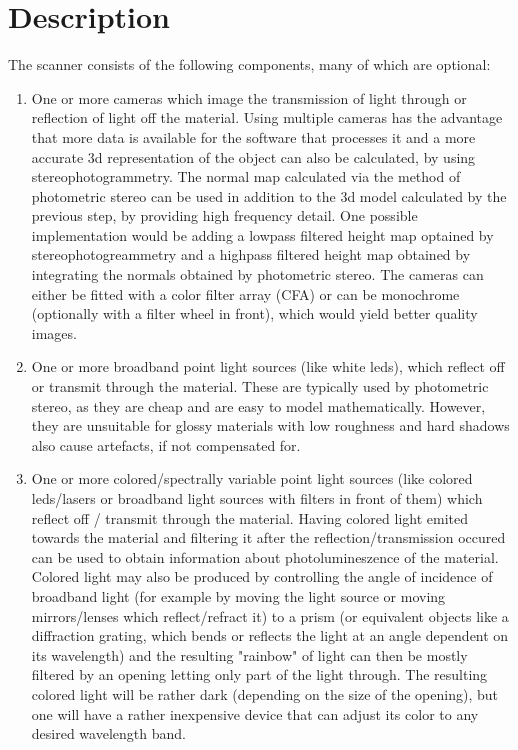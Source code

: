 \documentclass[11pt, twoside, listof=totocnumbered, bibliography=totocnumbered]{scrartcl}
\begin{document}
\section{Description}
The scanner consists of the following components, many of which are optional:
\begin{enumerate}
	\item One or more cameras which image the transmission of light through or reflection of light off the material. Using multiple cameras has the advantage that more data is available for the software that processes it and a more accurate 3d representation of the object can also be calculated, by using stereophotogrammetry. The normal map calculated via the method of photometric stereo can be used in addition to the 3d model calculated by the previous step, by providing high frequency detail. One possible implementation would be adding a lowpass filtered height map optained by stereophotogreammetry and a highpass filtered height map obtained by integrating the normals obtained by photometric stereo. The cameras can either be fitted with a color filter array (CFA) or can be monochrome (optionally with a filter wheel in front), which would yield better quality images.
	\item One or more broadband point light sources (like white leds), which reflect off or transmit through the material. These are typically used by photometric stereo, as they are cheap and are easy to model mathematically. However, they are unsuitable for glossy materials with low roughness and hard shadows also cause artefacts, if not compensated for.
	\item One or more colored/spectrally variable point light sources (like colored leds/lasers or broadband light sources with filters in front of them) which reflect off / transmit through the material. Having colored light emited towards the material and filtering it after the reflection/transmission occured can be used to obtain information about photolumineszence of the material. Colored light may also be produced by controlling the angle of incidence of broadband light (for example by moving the light source or moving mirrors/lenses which reflect/refract it) to a prism (or equivalent objects like a diffraction grating, which bends or reflects the light at an angle dependent on its wavelength) and the resulting "rainbow" of light can then be mostly filtered by an opening letting only part of the light through. The resulting colored light will be rather dark (depending on the size of the opening), but one will have a rather inexpensive device that can adjust its color to any desired wavelength band.

\end{enumerate}
\end{document}
